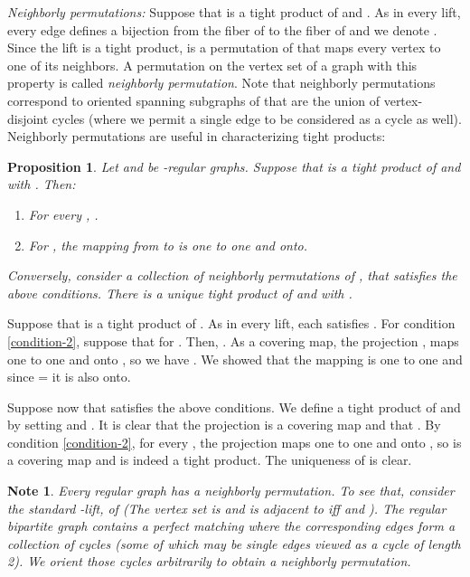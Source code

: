 \documentclass[12pt]{article}
\newtheorem{note}[theorem]{Note}
\newtheorem{proposition}[theorem]{Proposition}
\newtheorem{open question}[theorem]{Open question}
\newcommand{\proof}{{\par\noindent {\bf Proof}\space\space}}
\newcommand{\proofbox}{\begin{flushright}\end{flushright}}
\begin{document}
{\em Neighborly permutations:} Suppose that  is a tight product of  and . As in every lift, every edge  defines a bijection  from the fiber of  to the fiber of  and we denote . Since the lift  is a tight product,  is a permutation of  that maps every vertex to one of its neighbors. A permutation  on the vertex set of a graph  with this property is called {\em neighborly permutation}. Note that neighborly permutations correspond to oriented spanning subgraphs of  that are the union of vertex-disjoint cycles (where we permit a single edge to be considered as a cycle as well).\\
Neighborly permutations are useful in characterizing tight products:

\begin{proposition}\label{pro:tight-product-def-via-neighborly-permutation}
Let  and  be -regular graphs. Suppose that  is a tight product of  and  with . Then:
\begin{enumerate}
\item For every , .
\item For , the mapping  from  to  is one to one and onto.\label{condition-2}
\end{enumerate}
Conversely, consider a collection  of neighborly permutations of , that satisfies the above conditions. There is a unique tight product  of  and  with .
\end{proposition}
\proof
Suppose that  is a tight product of . As in every lift, each  satisfies . For condition \ref{condition-2}, suppose that  for . Then, . As a covering map, the projection , maps  one to one and onto , so we have . We showed that the mapping is one to one and since  =  it is also onto.

Suppose now that  satisfies the above conditions. We define a tight product  of  and  by setting  and . It is clear that the projection  is a covering map and that . By condition \ref{condition-2}, for every , the projection  maps  one to one and onto , so  is a covering map and  is indeed a tight product. The uniqueness of  is clear.
\proofbox
\begin{note} Every regular graph  has a neighborly permutation. To see that, consider the standard -lift,  of  (The vertex set is  and  is adjacent to  iff  and ). The regular bipartite graph  contains a perfect matching  where the corresponding edges  form a collection of cycles (some of which may be single edges viewed as a cycle of length 2). We orient those cycles arbitrarily to obtain a neighborly permutation.
\end{note}
\end{document}
